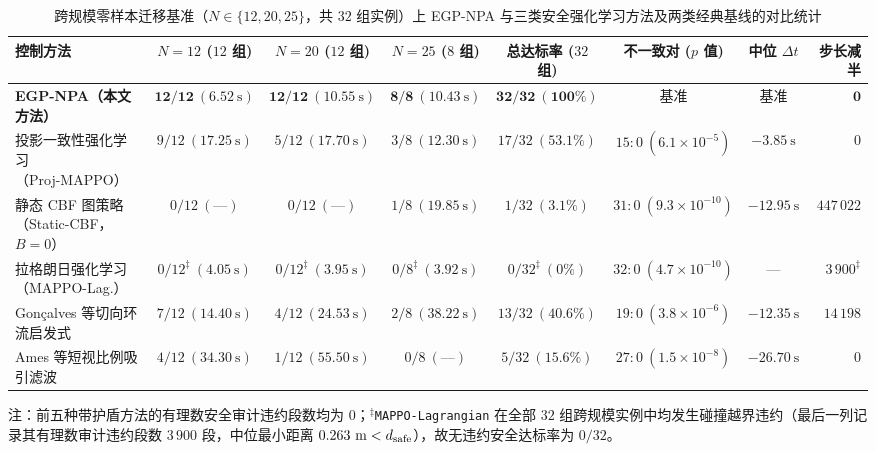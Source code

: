 \begin{table}[t]
 \centering\footnotesize
 \caption{跨规模零样本迁移基准（$N\in\{12,20,25\}$，共 $32$ 组实例）上 EGP-NPA 与三类安全强化学习方法及两类经典基线的对比统计}\label{tab:e2}
 \begin{tabularx}{\textwidth}{@{}Xccccccr@{}}
 \toprule
 控制方法 & $N=12$ ($12$ 组) & $N=20$ ($12$ 组) & $N=25$ ($8$ 组) & 总达标率 ($32$ 组) & 不一致对 ($p$ 值) & 中位 $\Delta t$ & 步长减半\\
 \midrule
 \textbf{EGP-NPA（本文方法）} & $\mathbf{12/12\ (6.52\ \mathrm s)}$ & $\mathbf{12/12\ (10.55\ \mathrm s)}$ & $\mathbf{8/8\ (10.43\ \mathrm s)}$ & $\mathbf{32/32\ (100\%)}$ & 基准 & 基准 & $\mathbf{0}$\\
 投影一致性强化学习\cite{wabersich2021,liu2026saferl}（Proj-MAPPO） & $9/12\ (17.25\ \mathrm s)$ & $5/12\ (17.70\ \mathrm s)$ & $3/8\ (12.30\ \mathrm s)$ & $17/32\ (53.1\%)$ & $15:0\ (6.1\times 10^{-5})$ & $-3.85\ \mathrm s$ & $0$\\
 静态 CBF 图策略\cite{zhang2025gcbf,zhang2025dgppo}（Static-CBF，$B=0$） & $0/12\ (\text{---})$ & $0/12\ (\text{---})$ & $1/8\ (19.85\ \mathrm s)$ & $1/32\ (3.1\%)$ & $31:0\ (9.3\times 10^{-10})$ & $-12.95\ \mathrm s$ & $447\,022$\\
 拉格朗日强化学习\cite{gu2023safe}（MAPPO-Lag.） & $0/12^\ddagger\ (4.05\ \mathrm s)$ & $0/12^\ddagger\ (3.95\ \mathrm s)$ & $0/8^\ddagger\ (3.92\ \mathrm s)$ & $0/32^\ddagger\ (0\%)$ & $32:0\ (4.7\times 10^{-10})$ & --- & $3\,900^\ddagger$\\
 Gon\c{c}alves 等\cite{goncalves2023circulation}切向环流启发式 & $7/12\ (14.40\ \mathrm s)$ & $4/12\ (24.53\ \mathrm s)$ & $2/8\ (38.22\ \mathrm s)$ & $13/32\ (40.6\%)$ & $19:0\ (3.8\times 10^{-6})$ & $-12.35\ \mathrm s$ & $14\,198$\\
 Ames 等\cite{ames2017cbf,reis2021}短视比例吸引滤波 & $4/12\ (34.30\ \mathrm s)$ & $1/12\ (55.50\ \mathrm s)$ & $0/8\ (\text{---})$ & $5/32\ (15.6\%)$ & $27:0\ (1.5\times 10^{-8})$ & $-26.70\ \mathrm s$ & $0$\\
 \bottomrule
 \end{tabularx}
 \vspace{1.5pt}
 \par\raggedright\scriptsize 注：前五种带护盾方法的有理数安全审计违约段数均为 $0$；$^\ddagger$\texttt{MAPPO-Lagrangian} 在全部 $32$ 组跨规模实例中均发生碰撞越界违约（最后一列记录其有理数审计违约段数 $3\,900$ 段，中位最小距离 $0.263\ \mathrm m<d_{\mathrm{safe}}$），故无违约安全达标率为 $0/32$。
\end{table}

